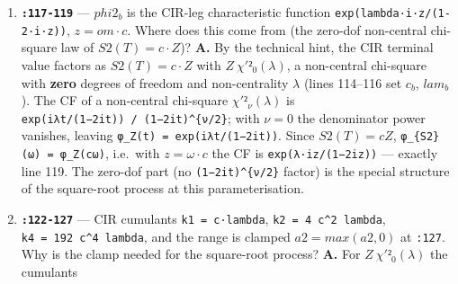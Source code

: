 \documentclass[
  11pt,
]{article}
\begin{document}
\begin{enumerate}
  while the long-maturity prices stay correct. The standard fixes, in
  order of preference: keep the \(√(c2 + √c4)\) form (do \textbf{not}
  drop to \(√c2\)) and/or add an explicit floor on the half-width, or
  raise \(L\) (line 65); the cleanest is a width floor so \([a,b]\)
  always contains \(ln K ± a few σ\). The \(√(c2 + √c4)\) form is the
  right safeguard because for heavy-tailed/short-maturity laws the
  variance \(c2\) alone \emph{understates} how far the relevant mass
  reaches --- the \(√c4\) term adds the kurtosis/tail contribution and
  keeps the interval from collapsing when \(c2\) is tiny but the tails
  (or the strike distance) still matter. A fixed wide interval is not a
  free lunch because COS resolution is \texttt{N/(b−a)}: widening
  \([a,b]\) for a fixed \(N\) \emph{coarsens} the cosine grid, so you
  trade truncation error for series-truncation error and must raise
  \(N\) (more cost) to keep the same accuracy --- the cumulant rule is
  precisely the device that picks \([a,b]\) just wide enough.
  \textbf{(Bruno: confirm which exact change you made --- \(L\) at line
  65, the width formula at line 70, or a floor --- and at which \(T\)
  you saw the price break; the analysis above is the correct general
  justification but the specific number/edit is yours.)}
\item
  \textbf{\texttt{:117-119}} --- \(phi2_b\) is the CIR-leg
  characteristic function \texttt{exp(lambda·i·z/(1-2·i·z))},
  \(z = om·c\). Where does this come from (the zero-dof non-central
  chi-square law of \(S2(T)=c·Z\))? \textbf{A.} By the technical hint,
  the CIR terminal value factors as \(S2(T) = c·Z\) with
  \(Z ~ χ'²_0(λ)\), a non-central chi-square with \textbf{zero} degrees
  of freedom and non-centrality \(λ\) (lines 114--116 set \(c_b\),
  \(lam_b\)). The CF of a non-central chi-square \(χ'²_ν(λ)\) is
  \texttt{exp(iλt/(1−2it))\ /\ (1−2it)\^{}\{ν/2\}}; with \(ν=0\) the
  denominator power vanishes, leaving
  \texttt{φ\_Z(t)\ =\ exp(iλt/(1−2it))}. Since \(S2(T) = cZ\),
  \texttt{φ\_\{S2\}(ω)\ =\ φ\_Z(cω)}, i.e.~with \(z = ω·c\) the CF is
  \texttt{exp(λ·iz/(1−2iz))} --- exactly line 119. The zero-dof part (no
  \texttt{(1−2it)\^{}\{ν/2\}} factor) is the special structure of the
  square-root process at this parameterisation.
\item
  \textbf{\texttt{:122-127}} --- CIR cumulants \texttt{k1\ =\ c·lambda},
  \texttt{k2\ =\ 4\ c\^{}2\ lambda},
  \texttt{k4\ =\ 192\ c\^{}4\ lambda}, and the range is clamped
  \(a2 = max(a2, 0)\) at \texttt{:127}. Why is the clamp needed for the
  square-root process? \textbf{A.} For \(Z ~ χ'²_0(λ)\) the cumulants

\end{enumerate}
\end{document}
